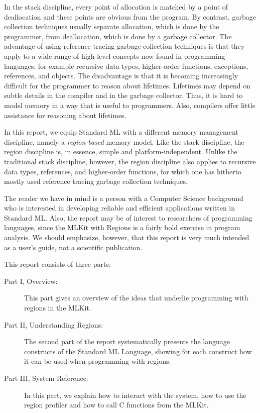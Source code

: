 \documentclass[12pt]{book}
\begin{document}
In the stack discipline, every point of allocation is matched by a
point of deallocation and these points are obvious from the
program. By contrast, garbage collection techniques usually separate
allocation, which is done by the programmer, from deallocation, which
is done by a garbage collector.  The advantage of using reference
tracing 
%
garbage collection techniques is that they apply to a wide range of
high-level concepts now found in programming languages, for example
recursive data types, higher-order functions, exceptions, references,
and objects. The disadvantage is that it is becoming increasingly
difficult for the programmer to reason about lifetimes. Lifetimes may
depend on subtle details in the compiler and in the garbage collector.
Thus, it is hard to model memory in a way that is useful to
programmers. Also, compilers offer little assistance for reasoning
about lifetimes.

In this report, we equip Standard ML with a different memory
management discipline, namely a {\em region-based} memory model.  Like
the stack discipline, the region discipline is, in essence, simple and
platform-independent. Unlike the traditional stack discipline,
however, the region discipline also applies to recursive data types,
references, and higher-order functions, for which one has hitherto
mostly used reference tracing garbage collection techniques.

The reader we have in mind is a person with a Computer Science
background who is interested in developing reliable and efficient
applications written in Standard ML. Also, the report may be of
interest to researchers of programming languages, since the MLKit
with Regions is a fairly bold exercise in program analysis. We should
emphasize, however, that this report is very much intended as a user's
guide, not a scientific publication.

This report consists of three parts:
\begin{description}
\item[Part I, Overview:] This part gives an overview of the ideas
  that underlie programming with regions in the MLKit.
\item[Part II, Understanding Regions:] The second part of the report
  systematically presents the language constructs of the Standard ML
  Language, showing for each construct how it can be used when
  programming with regions.
\item[Part III, System Reference:] In this part, we explain how to
  interact with the system, how to use the region profiler and how to
  call C functions from the MLKit.
\end{description}
\end{document}
